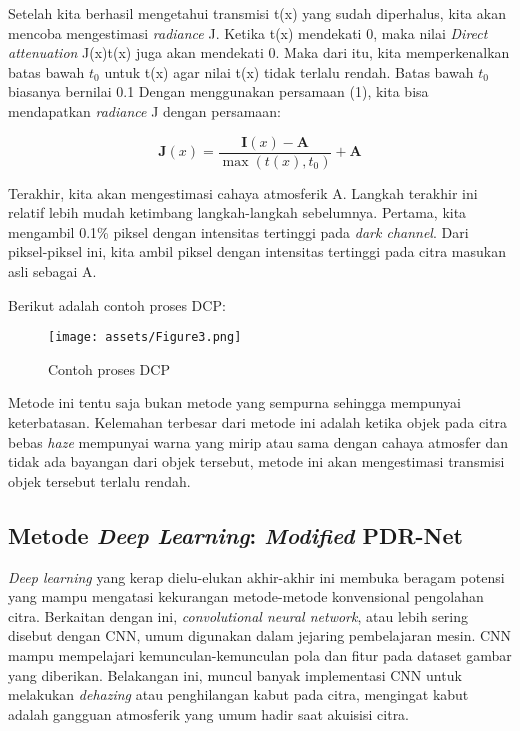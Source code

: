 \documentclass[11pt, a4paper, final]{report}
\begin{document}
Setelah kita berhasil mengetahui transmisi t(x) yang sudah diperhalus, kita akan mencoba mengestimasi \textit{radiance} J. Ketika t(x) mendekati 0, maka nilai \textit{Direct attenuation} J(x)t(x) juga akan mendekati 0. Maka dari itu, kita memperkenalkan batas bawah $t_0$ untuk t(x) agar nilai t(x) tidak terlalu rendah. Batas bawah $t_0$ biasanya bernilai 0.1 Dengan menggunakan persamaan (1), kita bisa mendapatkan \textit{radiance} J dengan persamaan:

\begin{equation} \label{eq19}
\mathbf{J}(x)=\dfrac{\mathbf{I}(x)-\mathbf{A}}{\max{(t(x),t_0)}}+\mathbf{A}
\end{equation}

Terakhir, kita akan mengestimasi cahaya atmosferik A. Langkah terakhir ini relatif lebih mudah ketimbang langkah-langkah sebelumnya. Pertama, kita mengambil 0.1\% piksel dengan intensitas tertinggi pada \textit{dark channel}. Dari piksel-piksel ini, kita ambil piksel dengan intensitas tertinggi pada citra masukan asli sebagai A.

Berikut adalah contoh proses DCP:

\begin{figure}[htbp]
\centering
\texttt{[image: assets/Figure3.png]}
\caption{Contoh proses DCP}
\end{figure}

\newpage

Metode ini tentu saja bukan metode yang sempurna sehingga mempunyai keterbatasan. Kelemahan terbesar dari metode ini adalah ketika objek pada citra bebas \textit{haze} mempunyai warna yang mirip atau sama dengan cahaya atmosfer dan tidak ada bayangan dari objek tersebut, metode ini akan mengestimasi transmisi objek tersebut terlalu rendah.


\subsection{Metode \textit{Deep Learning}: \textit{Modified} PDR-Net}

\textit{Deep learning} yang kerap dielu-elukan akhir-akhir ini membuka beragam potensi yang mampu  mengatasi kekurangan metode-metode konvensional pengolahan citra. Berkaitan dengan ini, \textit{convolutional neural network}, atau lebih sering disebut dengan CNN, umum digunakan dalam jejaring pembelajaran mesin. CNN mampu mempelajari kemunculan-kemunculan pola dan fitur pada dataset gambar yang diberikan. Belakangan ini, muncul banyak implementasi CNN untuk melakukan \textit{dehazing} atau penghilangan kabut pada citra, mengingat kabut adalah gangguan atmosferik yang umum hadir saat akuisisi citra.
\end{document}
